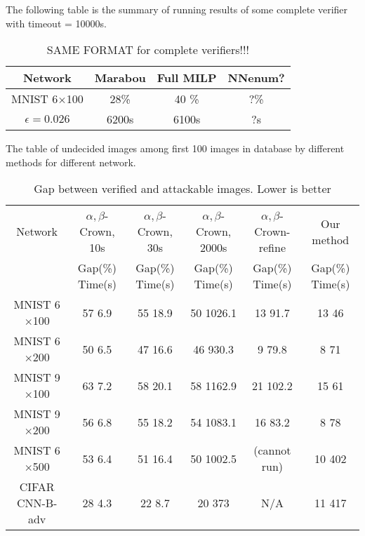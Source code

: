 \vspace*{4ex}


The following table is the summary of running results of some complete verifier with timeout = 10000s. 

\begin{table}
	\centering
	\caption{SAME FORMAT for complete verifiers!!!}
	\label{table_complete}
	\begin{tabular}{||c||c|c|c||}
		\hline
		Network &  Marabou  & Full MILP & NNenum? \\ \hline
		MNIST 6$\times$100 & 28\% & 40 \% & ?\%   \\ \hline
		$\epsilon = 0.026$ & 6200s & 6100s
		&  ?s  \\  \hline
	\end{tabular}
\end{table}


\vspace*{4ex}

The table of undecided images among first 100 images in database by different methods for different network.


\begin{table}
	\centering
	\caption{Gap between verified and attackable images. Lower is better}
	\label{table_undecided}
	\begin{tabular}{|c|c|c|c|c|c|}
		\hline
		Network & $\alpha,\beta$-Crown, 10s & $\alpha,\beta$-Crown, 30s & $\alpha,\beta$-Crown, 2000s & $\alpha,\beta$-Crown-refine & Our method \\ 
		& Gap(\%) \hfill Time(s) & Gap(\%) \hfill Time(s) & Gap(\%) \hfill Time(s) & Gap(\%) \hfill Time(s) & Gap(\%) \hfill Time(s)\\ \hline
		MNIST 6$\times$100 & 57 \hfill 6.9 & 55 \hfill 18.9 & 50 \hfill 1026.1 & 13 \hfill 91.7 & 13 \hfill 46 \\ \hline
		MNIST 6$\times$200 & 50 \hfill 6.5 & 47 \hfill 16.6 & 46 \hfill 930.3 & 9 \hfill 79.8 & 8 \hfill 71 \\ \hline
		MNIST 9$\times$100 & 63 \hfill 7.2 & 58 \hfill 20.1 & 58 \hfill 1162.9 & 21 \hfill 102.2 & 15 \hfill 61 \\ \hline
		MNIST 9$\times$200 & 56 \hfill 6.8 & 55 \hfill 18.2 & 54 \hfill 1083.1 & 16 \hfill 83.2 & 8 \hfill 78 \\ \hline
		MNIST 6$\times$500 & 53 \hfill 6.4 & 51 \hfill 16.4 & 50 \hfill 1002.5 & (cannot run) & 10 \hfill 402 \\ \hline
		CIFAR CNN-B-adv & 28 \hfill 4.3 & 22 \hfill 8.7 & 20 \hfill 373 & N/A & 11 \hfill 417 \\ \hline
	\end{tabular}
\end{table}